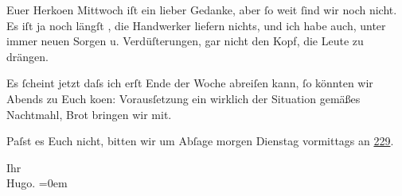\pstart
           Euer Herko{\geminationm}en Mittwoch iſt ein lieber
               Gedanke, aber{ }ſo weit{ }ſind wir noch nicht. Es iſt ja noch längſt \label{K_L02254-1v}\label{K_L02254-1}, die Handwerker liefern nichts, und ich habe auch, unter
               immer neuen Sorgen u. Verdüſterungen, gar nicht den Kopf, {\pb}die Leute zu drängen.\pend
           
\pstart
           Es{ }ſcheint jetzt daſs ich erſt Ende der Woche abreiſen kann,{ }ſo könnten wir \label{K_L02254-2v}\label{K_L02254-2}{ }Abends zu Euch ko{\geminationm}en: Vorausſetzung ein
               wirklich der Situation gemäßes Nachtmahl, Brot bringen wir mit.\pend
           
\pstart
           Paſst es Euch nicht, bitten wir um Abſage morgen Dienstag{ }vormittags an \uline{229}.\pend
           
\pstart
           Ihr{\\[\baselineskip]}\spacefill\mbox{Hugo.}\pend
           \leftskip=0em{}\endnumbering{}  \newcommand{\dateiname}{L02254}\newcommand{\titel}{Hugo von Hofmannsthal an Arthur Schnitzler, [5. 2. 1917]}\newcommand{\editorInnen}{Martin Anton Müller und Gerd-Hermann Susen}
